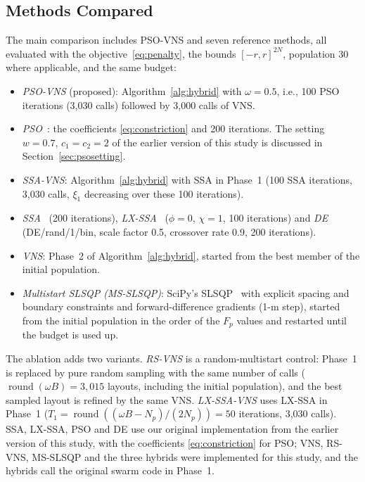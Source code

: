\documentclass[journal,twoside]{IEEEtran}
\begin{document}
\subsection{Methods Compared}
The main comparison includes PSO-VNS and seven reference methods, all evaluated with the objective~\eqref{eq:penalty}, the bounds $[-r,r]^{2N}$, population 30 where applicable, and the same budget:
\begin{itemize}
\item \emph{PSO-VNS} (proposed): Algorithm~\ref{alg:hybrid} with $\omega=0.5$, i.e., 100 PSO iterations (3,030 calls) followed by 3,000 calls of VNS.
\item \emph{PSO}~\cite{Kennedy1995,Clerc2002}: the coefficients \eqref{eq:constriction} and 200 iterations. The setting $w=0.7$, $c_1=c_2=2$ of the earlier version of this study is discussed in Section~\ref{sec:psosetting}.
\item \emph{SSA-VNS}: Algorithm~\ref{alg:hybrid} with SSA in Phase~1 (100 SSA iterations, 3,030 calls, $\xi_1$ decreasing over these 100 iterations).
\item \emph{SSA}~\cite{Mirjalili2017} (200 iterations), \emph{LX-SSA}~\cite{Solanki2023} ($\phi=0$, $\chi=1$, 100 iterations) and \emph{DE}~\cite{Storn1997} (DE/rand/1/bin, scale factor 0.5, crossover rate 0.9, 200 iterations).
\item \emph{VNS}: Phase~2 of Algorithm~\ref{alg:hybrid}, started from the best member of the initial population.
\item \emph{Multistart SLSQP (MS-SLSQP)}: SciPy's SLSQP~\cite{Kraft1988} with explicit spacing and boundary constraints and forward-difference gradients (1-m step), started from the initial population in the order of the $F_p$ values and restarted until the budget is used up.
\end{itemize}
The ablation adds two variants. \emph{RS-VNS} is a random-multistart control: Phase~1 is replaced by pure random sampling with the same number of calls ($\operatorname{round}(\omega B)=3{,}015$ layouts, including the initial population), and the best sampled layout is refined by the same VNS. \emph{LX-SSA-VNS} uses LX-SSA in Phase~1 ($T_1=\operatorname{round}((\omega B-N_p)/(2N_p))=50$ iterations, 3,030 calls). SSA, LX-SSA, PSO and DE use our original implementation from the earlier version of this study, with the coefficients \eqref{eq:constriction} for PSO; VNS, RS-VNS, MS-SLSQP and the three hybrids were implemented for this study, and the hybrids call the original swarm code in Phase~1.
\end{document}
